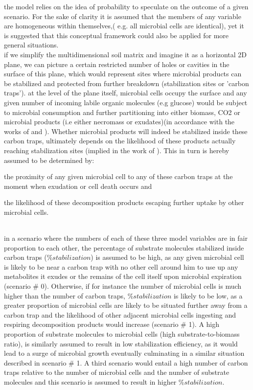 \documentclass[12pt]{report}
\begin{document}
		the model relies  on the idea of probability to speculate on the outcome of a given scenario.
		For the sake of clarity it is assumed that the members of any variable are homogeneous within themselves,( e.g. all microbial cells are identical), yet it is suggested that this conceptual framework could also be applied for more general situations.\\
		if we simplify the multidimensional soil matrix and imagine it as a horizontal 2D plane, we can picture a certain restricted number of holes or cavities in the surface of this plane, which would represent sites where microbial products can be stabilized and protected from further breakdown (stabilization sites or 'carbon traps'). at the level of the plane itself, microbial cells occupy the surface and any given number of incoming labile organic molecules (e.g glucose) would be subject to microbial consumption and further partitioning into either biomass, CO2 or microbial products (i.e either necromass or exudates)(in accordance with the works of \citeauthor{fischer2010} and \citeauthor{gunina2014}). Whether microbial products will indeed be stabilized inside these carbon traps, ultimately depends on the likelihood of these products actually reaching stabilization sites (implied in the work of \citeauthor{kravchenko2015}). This in turn is hereby assumed to be determined by:
		\begin{enumerate*}[label=(\arabic*)]
			\item the proximity of any given microbial cell to any of these carbon traps at the moment when exudation or cell death occurs and
			\item the likelihood of these decomposition products escaping further uptake by other microbial cells.
		\end{enumerate*}\\
		in a scenario where the numbers of each of these three model variables are in fair proportion to each other, the percentage of substrate molecules stabilized inside carbon traps ($ \%stabilization $) is assumed to be high, as any given microbial cell is likely to be near a carbon trap with no other cell around him to use up any metabolites it exudes or the remains of the cell itself upon microbial expiration (scenario \# 0). Otherwise, if for instance the number of microbial cells is much higher than the number of carbon traps, $ \%stabilization  $ is likely to be low, as a greater proportion of microbial cells are likely to be situated further away from a carbon trap and the likelihood of other adjacent microbial cells ingesting and respiring decomposition products would increase (scenario \# 1). A high proportion of substrate molecules to microbial cells (high substrate-to-biomass ratio),  is similarly assumed to result in low stabilization efficiency, as it would lead to a surge  of microbial growth eventually culminating in a similar situation described in scenario \# 1. A third scenario would entail a high number of carbon traps relative to the number of microbial cells and the number of substrate molecules and this scenario is assumed to result in higher $ \%stabilization $.\\
\end{document}
